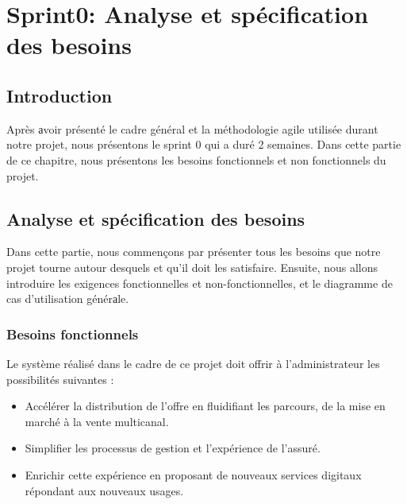 \chapter{Sprint0: Analyse et spécification des besoins}

\section*{Introduction}
Après аvoir présenté le cadre général et la méthodologie agile utilisée durant notre projet, nous présentons le sprint 0 qui a duré 2 semaines. Dans cette partie de ce chapitre, nous présentons les besoins fonctionnels et non fonctionnels du projet.
\section{Analyse et spécification des besoins}
Dans cette partie, nous commençons par présenter tous les besoins que notre projet tourne autour desquels et qu’il doit les satisfaire. Ensuite, nous allons introduire les exigences fonctionnelles et non-fonctionnelles, et le diagramme de cas d’utilisation générаle.
\subsection{Besoins fonctionnels}
Le système réalisé dans le cadre de ce projet doit offrir à l’administrateur les possibilités suivantes :
\newpage
                \begin{itemize}
                \item Accélérer la distribution de l’offre en fluidifiant les parcours, de la mise en marché à la vente multicanal.
                \item Simplifier les processus de gestion et l’expérience de l’assuré.
                \item Enrichir cette expérience en proposant de nouveaux services digitaux répondant aux nouveaux usages.
                \end{itemize}



